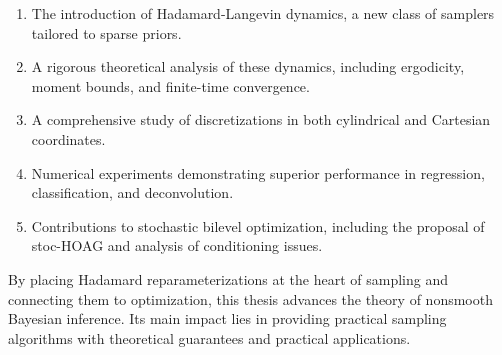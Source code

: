 \documentclass[11pt, twoside]{report}
\begin{document}
\begin{enumerate}
    \item The introduction of Hadamard-Langevin dynamics, a new class of samplers tailored to sparse priors.
    \item A rigorous theoretical analysis of these dynamics, including ergodicity, moment bounds, and finite-time convergence.
    \item A comprehensive study of discretizations in both cylindrical and Cartesian coordinates.
    \item Numerical experiments demonstrating superior performance in regression, classification, and deconvolution.
    \item Contributions to stochastic bilevel optimization, including the proposal of stoc-HOAG and analysis of conditioning issues.
\end{enumerate}

By placing Hadamard reparameterizations at the heart of sampling and connecting them to optimization, this thesis advances the theory of nonsmooth Bayesian inference. Its main impact lies in providing practical sampling algorithms with theoretical guarantees and practical applications.
\end{document}
